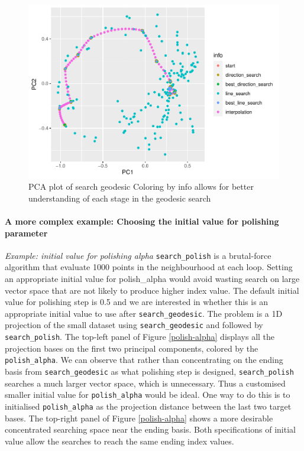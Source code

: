 \documentclass[12pt]{article}
\begin{document}
\begin{figure}
\centering
\includegraphics{paper_files/figure-latex/pca-1.pdf}
\caption{\label{pca}PCA plot of search geodesic Coloring by info allows
for better understanding of each stage in the geodesic search}
\end{figure}

\hypertarget{a-more-complex-example-choosing-the-initial-value-for-polishing-parameter}{%
\paragraph{A more complex example: Choosing the initial value for
polishing
parameter}\label{a-more-complex-example-choosing-the-initial-value-for-polishing-parameter}}

\emph{Example: initial value for polishing alpha}
\texttt{search\_polish} is a brutal-force algorithm that evaluate 1000
points in the neighbourhood at each loop. Setting an appropriate initial
value for polish\_alpha would avoid wasting search on large vector space
that are not likely to produce higher index value. The default initial
value for polishing step is 0.5 and we are interested in whether this is
an appropriate initial value to use after \texttt{search\_geodesic}. The
problem is a 1D projection of the small dataset using
\texttt{search\_geodesic} and followed by \texttt{search\_polish}. The
top-left panel of Figure \ref{polish-alpha} displays all the projection
bases on the first two principal components, colored by the
\texttt{polish\_alpha}. We can observe that rather than concentrating on
the ending basis from \texttt{search\_geodesic} as what polishing step
is designed, \texttt{search\_polish} searches a much larger vector
space, which is unnecessary. Thus a customised smaller initial value for
\texttt{polish\_alpha} would be ideal. One way to do this is to
initialised \texttt{polish\_alpha} as the projection distance between
the last two target bases. The top-right panel of Figure
\ref{polish-alpha} shows a more desirable concentrated searching space
near the ending basis. Both specifications of initial value allow the
searches to reach the same ending index values.
\end{document}
